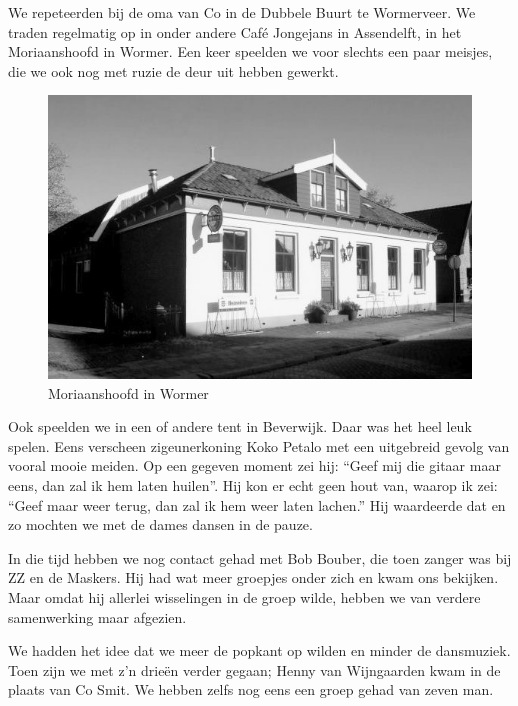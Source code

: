 \documentclass[12pt,twoside, openright]{memoir}
\begin{document}
We repeteerden bij de oma van Co in de Dubbele Buurt te Wormerveer. We traden regelmatig op in onder andere Café Jongejans in Assendelft, in het Moriaanshoofd in Wormer. Een keer speelden we voor slechts een paar meisjes, die we ook nog met ruzie de deur uit hebben gewerkt. 

\begin{figure}
\centering
\includegraphics[width=\textwidth]{img/ch26/Moriaanshoofd}
\caption*{\footnotesize Moriaanshoofd in Wormer}
\end{figure}

Ook speelden we in een of andere tent in Beverwijk. Daar was het heel leuk spelen. Eens verscheen zigeunerkoning Koko Petalo met een uitgebreid gevolg van vooral mooie meiden. Op een gegeven moment zei hij: ``Geef mij die gitaar maar eens, dan zal ik hem laten huilen''. Hij kon er echt geen hout van, waarop ik zei: ``Geef maar weer terug, dan zal ik hem weer laten lachen.'' Hij waardeerde dat en zo mochten we met de dames dansen in de pauze.

In die tijd hebben we nog contact gehad met Bob Bouber, die toen zanger was bij ZZ en de Maskers. Hij had wat meer groepjes onder zich en kwam ons bekijken. Maar omdat hij allerlei wisselingen in de groep wilde, hebben we van verdere samenwerking maar afgezien. 

We hadden het idee dat we meer de popkant op wilden en minder de dansmuziek. Toen zijn we met z’n drieën verder gegaan; Henny van Wijngaarden kwam in de plaats van Co Smit. We hebben zelfs nog eens een groep gehad van zeven man.
\end{document}

